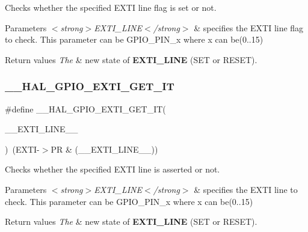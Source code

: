 Checks whether the specified E\+X\+TI line flag is set or not. 


\begin{DoxyParams}{Parameters}
{\em $<$strong$>$\+E\+X\+T\+I\+\_\+\+L\+I\+N\+E$<$/strong$>$} & specifies the E\+X\+TI line flag to check. This parameter can be G\+P\+I\+O\+\_\+\+P\+I\+N\+\_\+x where x can be(0..15) \\
\hline
\end{DoxyParams}

\begin{DoxyRetVals}{Return values}
{\em The} & new state of {\bfseries{E\+X\+T\+I\+\_\+\+L\+I\+NE}} (S\+ET or R\+E\+S\+ET). \\
\hline
\end{DoxyRetVals}
\mbox{\label{group___g_p_i_o___exported___macros_ga27f0e1f6c38745169d74620f6a178a94}} 
\subsubsection{\texorpdfstring{\_\_HAL\_GPIO\_EXTI\_GET\_IT}{\_\_HAL\_GPIO\_EXTI\_GET\_IT}}
{\footnotesize\ttfamily \#define \+\_\+\+\_\+\+H\+A\+L\+\_\+\+G\+P\+I\+O\+\_\+\+E\+X\+T\+I\+\_\+\+G\+E\+T\+\_\+\+IT(\begin{DoxyParamCaption}\item[{}]{\+\_\+\+\_\+\+E\+X\+T\+I\+\_\+\+L\+I\+N\+E\+\_\+\+\_\+ }\end{DoxyParamCaption})~(E\+X\+TI-\/$>$PR \& (\+\_\+\+\_\+\+E\+X\+T\+I\+\_\+\+L\+I\+N\+E\+\_\+\+\_\+))}



Checks whether the specified E\+X\+TI line is asserted or not. 


\begin{DoxyParams}{Parameters}
{\em $<$strong$>$\+E\+X\+T\+I\+\_\+\+L\+I\+N\+E$<$/strong$>$} & specifies the E\+X\+TI line to check. This parameter can be G\+P\+I\+O\+\_\+\+P\+I\+N\+\_\+x where x can be(0..15) \\
\hline
\end{DoxyParams}

\begin{DoxyRetVals}{Return values}
{\em The} & new state of {\bfseries{E\+X\+T\+I\+\_\+\+L\+I\+NE}} (S\+ET or R\+E\+S\+ET). \\
\hline
\end{DoxyRetVals}

